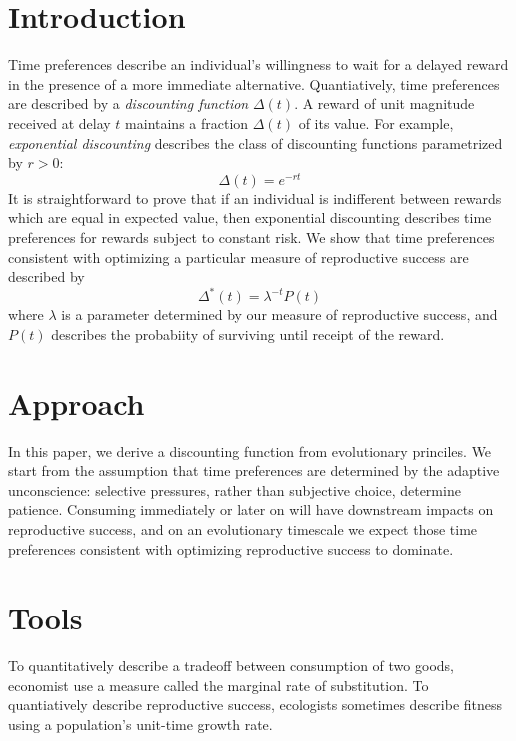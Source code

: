 \documentclass[titlepage, hidelinks, 12pt]{article}
\theoremstyle{plain}
\theoremstyle{remark}
\theoremstyle{definition}
\begin{document}
\section{Introduction}

Time preferences describe an individual's willingness to wait for a delayed reward in the presence of a more immediate alternative. Quantiatively,
time preferences are described by a \textit{discounting function} $\Delta(t)$. A reward of unit magnitude received at delay $t$ maintains a fraction
$\Delta(t)$ of its value. For example, \textit{exponential discounting} describes the class of discounting functions parametrized by $r>0$:
\begin{equation}
    \Delta(t) = e^{-rt}
    \label{eqn:exponential_discounting}
\end{equation}
It is straightforward to prove that if an individual is indifferent between rewards which are equal in expected value, then exponential discounting
describes time preferences for rewards subject to constant risk. We show that time preferences consistent with optimizing a particular measure of
reproductive success are described by
\begin{equation}
    \Delta^*(t) = \lambda^{-t}P(t)
    \label{eqn:evolutionary_discounting}
\end{equation}
where $\lambda$ is a parameter determined by our measure of reproductive success, and $P(t)$ describes the probabiity of surviving until receipt
of the reward. 


\section{Approach}

In this paper, we derive a discounting function from evolutionary princiles. We start from the assumption that time preferences are
determined by the adaptive unconscience: selective pressures, rather than subjective choice, determine patience. Consuming immediately or later on
will have downstream impacts on reproductive success, and on an evolutionary timescale we expect those time preferences consistent with 
optimizing reproductive success to dominate. 

\section{Tools}
To quantitatively describe a tradeoff between consumption of two goods, economist use a measure called the marginal rate of substitution. To 
quantiatively describe reproductive success, ecologists sometimes describe fitness using a population's unit-time growth rate. 
\end{document}
